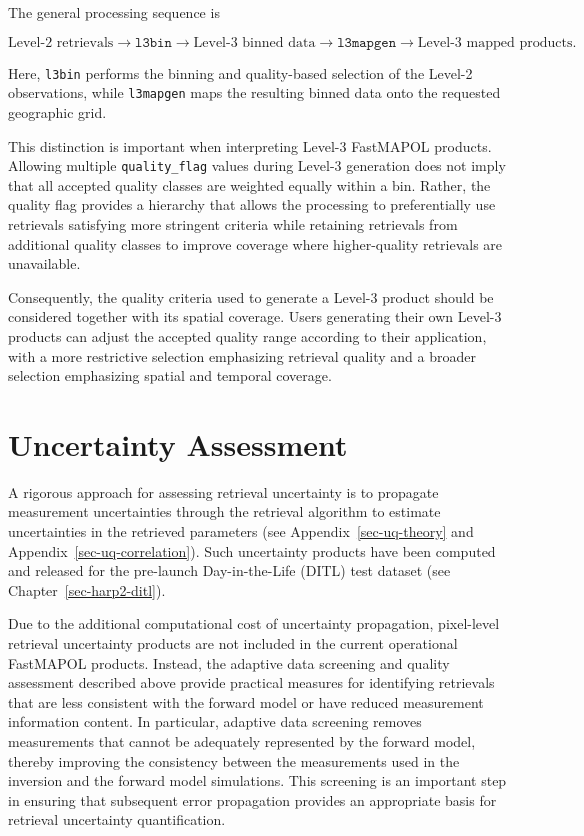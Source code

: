 \documentclass[
  11pt,
  letterpaper,
]{scrreprt}
\begin{document}
The general processing sequence is

\[
\text{Level-2 retrievals}
\rightarrow
\texttt{l3bin}
\rightarrow
\text{Level-3 binned data}
\rightarrow
\texttt{l3mapgen}
\rightarrow
\text{Level-3 mapped products}.
\]

Here, \texttt{l3bin} performs the binning and quality-based selection of
the Level-2 observations, while \texttt{l3mapgen} maps the resulting
binned data onto the requested geographic grid.

This distinction is important when interpreting Level-3 FastMAPOL
products. Allowing multiple \texttt{quality\_flag} values during Level-3
generation does not imply that all accepted quality classes are weighted
equally within a bin. Rather, the quality flag provides a hierarchy that
allows the processing to preferentially use retrievals satisfying more
stringent criteria while retaining retrievals from additional quality
classes to improve coverage where higher-quality retrievals are
unavailable.

Consequently, the quality criteria used to generate a Level-3 product
should be considered together with its spatial coverage. Users
generating their own Level-3 products can adjust the accepted quality
range according to their application, with a more restrictive selection
emphasizing retrieval quality and a broader selection emphasizing
spatial and temporal coverage.

\section{Uncertainty Assessment}\label{uncertainty-assessment}

A rigorous approach for assessing retrieval uncertainty is to propagate
measurement uncertainties through the retrieval algorithm to estimate
uncertainties in the retrieved parameters (see
Appendix~\ref{sec-uq-theory} and Appendix~\ref{sec-uq-correlation}).
Such uncertainty products have been computed and released for the
pre-launch Day-in-the-Life (DITL) test dataset (see
Chapter~\ref{sec-harp2-ditl}).

Due to the additional computational cost of uncertainty propagation,
pixel-level retrieval uncertainty products are not included in the
current operational FastMAPOL products. Instead, the adaptive data
screening and quality assessment described above provide practical
measures for identifying retrievals that are less consistent with the
forward model or have reduced measurement information content. In
particular, adaptive data screening removes measurements that cannot be
adequately represented by the forward model, thereby improving the
consistency between the measurements used in the inversion and the
forward model simulations. This screening is an important step in
ensuring that subsequent error propagation provides an appropriate basis
for retrieval uncertainty quantification.
\end{document}
